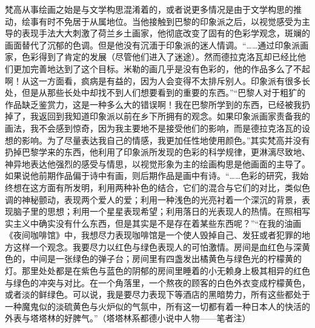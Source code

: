 \documentclass{article}
\begin{document}
梵高从事绘画之始是与文学构思混淆着的，或者说更多情况是由于文学构思的推动，绘事有时不免居于从属地位。当他接触到巴黎的印象派之后，以视觉感受为主导的表现手法大大刺激了荷兰乡土画家，他彻底改变了固有的色彩学观念，斑斓的画面替代了沉郁的色调。但是他没有沉湎于印象派的迷人情调。“……通过印象派画家，色彩得到了肯定的发展（尽管他们进入了迷途）。然而德拉克洛瓦却已经比他们更加完善地达到了这个目标。米勒的画几乎是没有色彩的，他的作品多么了不起啊！从这一方面看，疯病是有益的，因为人会变得不太排斥别人。印象派有很多长处，但是从那些长处中却找不到人们想要看到的重要的东西。”“巴黎人对于粗犷的作品缺乏鉴赏力，这是一种多么大的错误啊！我在巴黎所学到的东西，已经被我扔掉了，我返回到我知道印象派以前在乡下所拥有的观念。如果印象派画家责备我的画法，我不会感到惊奇，因为我主要地不是接受他们的影响，而是德拉克洛瓦的设想的影响。为了尽量表达我自己的情感，我更加任性地使用颜色。”其实梵高并没有扔掉巴黎学来的东西，他利用了印象派所发现的色彩的科学规律，更淋漓尽致地、神异地表达他强烈的感受与情思，以视觉形象为主的绘画构思是他画面的主导了。如果说他前期作品偏于诗中有画，则后期作品是画中有诗。“……色彩的研究，我始终想在这方面有所发明，利用两种补色的结合，它们的混合与它们的对比，类似色调的神秘颤动，表现两个爱人的爱；利用一种浅色的光亮衬着一个深沉的背景，表现脑子里的思想；利用一个星星表现希望；利用落日的光表现人的热情。在照相写实主义中确实没有什么东西，但是其实是不是存在着某些东西呢？”“在我的油画《夜间咖啡馆》中，我想尽力表现咖啡馆是一个使人毁掉自己、发狂或者犯罪的地方这样一个观念。我要尽力以红色与绿色表现人的可怕激情。房间是血红色与深黄色的，中间是一张绿色的弹子台；房间里有四盏发出橘黄色与绿色光的柠檬黄的灯。那里处处都是在紫色与蓝色的阴郁的房间里睡着的小无赖身上极其相异的红色与绿色的冲突与对比。在一个角落里，一个熬夜的顾客的白色外衣变成柠檬黄色，或者淡的鲜绿色。可以说，我是要尽力表现下等酒店的黑暗势力，所有这些都处于一种魔鬼似的淡硫黄色与火炉似的气氛中，所有这一切都有着一种日本人的快活的外表与塔塔林的好脾气。”（塔塔林系都德小说中人物——笔者注）
\end{document}
